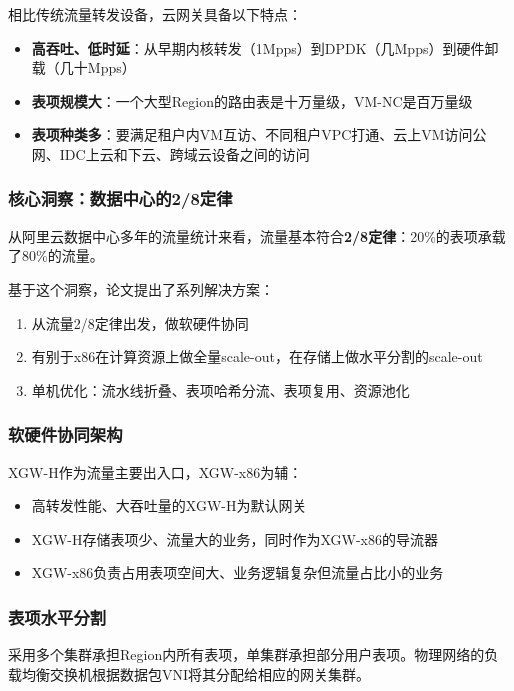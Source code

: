 相比传统流量转发设备，云网关具备以下特点：
\begin{itemize}
    \item \textbf{高吞吐、低时延}：从早期内核转发（1Mpps）到DPDK（几Mpps）到硬件卸载（几十Mpps）
    \item \textbf{表项规模大}：一个大型Region的路由表是十万量级，VM-NC是百万量级
    \item \textbf{表项种类多}：要满足租户内VM互访、不同租户VPC打通、云上VM访问公网、IDC上云和下云、跨域云设备之间的访问
\end{itemize}

\subsubsection{核心洞察：数据中心的2/8定律}

从阿里云数据中心多年的流量统计来看，流量基本符合\textbf{2/8定律}：20\%的表项承载了80\%的流量。

基于这个洞察，论文提出了系列解决方案：
\begin{enumerate}
    \item 从流量2/8定律出发，做软硬件协同
    \item 有别于x86在计算资源上做全量scale-out，在存储上做水平分割的scale-out
    \item 单机优化：流水线折叠、表项哈希分流、表项复用、资源池化
\end{enumerate}

\subsubsection{软硬件协同架构}

XGW-H作为流量主要出入口，XGW-x86为辅：
\begin{itemize}
    \item 高转发性能、大吞吐量的XGW-H为默认网关
    \item XGW-H存储表项少、流量大的业务，同时作为XGW-x86的导流器
    \item XGW-x86负责占用表项空间大、业务逻辑复杂但流量占比小的业务
\end{itemize}

\subsubsection{表项水平分割}

采用多个集群承担Region内所有表项，单集群承担部分用户表项。物理网络的负载均衡交换机根据数据包VNI将其分配给相应的网关集群。

